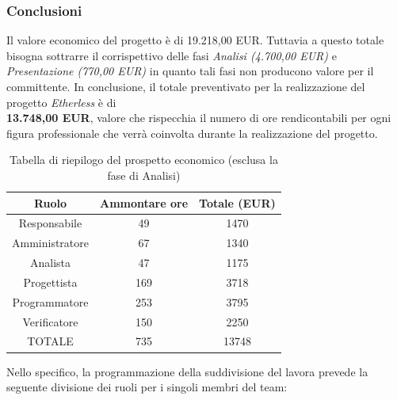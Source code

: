 \subsubsection{Conclusioni}
Il valore economico del progetto è di 19.218,00 EUR. Tuttavia a questo totale bisogna sottrarre il corrispettivo delle fasi \textit{Analisi (4.700,00 EUR)} e \textit{Presentazione (770,00 EUR)} in quanto tali fasi non producono valore per il committente.
\newline
\newline
In conclusione, il totale preventivato per la realizzazione del progetto \textit{Etherless} è di\\ \textbf{13.748,00 EUR}, valore che rispecchia il numero di ore rendicontabili per ogni figura professionale che verrà coinvolta durante la realizzazione del progetto. 
\begin{table}[h]
\caption{Tabella di riepilogo del prospetto economico (esclusa la fase di Analisi)} 
\begin{center}
\begin{tabular}{ |c|c|c|  }
 \hline
 Ruolo 		& Ammontare ore 	& Totale (EUR)\\
 \hline
 \hline
 	Responsabile	& 49 	& 1470\\
	Amministratore	& 67		& 1340\\
	Analista		& 47 	& 1175\\
	Progettista		& 169	& 3718\\
	Programmatore	& 253	& 3795\\
	Verificatore	& 150 	& 2250\\
 \hline\hline
 TOTALE		& 735		& 13748\\
  \hline
\end{tabular}
\end{center}
\end{table}
Nello specifico, la programmazione della suddivisione del lavora prevede la seguente divisione dei ruoli per i singoli membri del team:

